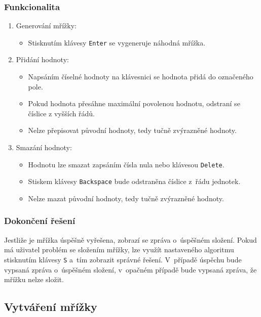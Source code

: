 \subsubsection*{Funkcionalita}
\label{sec:board-solving}
\begin{enumerate}
    \item Generování mřížky:
    \begin{itemize}
        \item Stisknutím klávesy \texttt{Enter} se vygeneruje náhodná mřížka.
    \end{itemize}
    \item Přidání hodnoty:
    \begin{itemize}
        \item Napsáním číselné hodnoty na klávesnici se hodnota přidá do
            označeného pole.
        \item Pokud hodnota přesáhne maximální povolenou hodnotu, odstraní
            se číslice z vyšších řádů.
        \item Nelze přepisovat původní hodnoty, tedy tučně zvýrazněné hodnoty.
    \end{itemize}
    \item Smazání hodnoty:
    \begin{itemize}
        \item Hodnotu lze smazat zapsáním čísla nula nebo klávesou
            \texttt{Delete}.
        \item Stiskem klávesy \texttt{Backspace} bude odstraněna číslice z~řádu
            jednotek.
        \item Nelze mazat původní hodnoty, tedy tučně zvýrazněné hodnoty.
    \end{itemize}
\end{enumerate}

\subsubsection*{Dokončení řešení}

Jestliže je mřížka úspěšně vyřešena, zobrazí se zpráva o~úspěšném složení.
Pokud má uživatel problém se složením mřížky, lze využít nastaveného algoritmu
stisknutím klávesy \texttt{S} a~tím zobrazit správné řešení. V~případě úspěchu
bude vypsaná zpráva o~úspěšném složení, v~opačném případě bude vypsaná zpráva,
že mřížku nelze složit.

\subsection{Vytváření mřížky}

